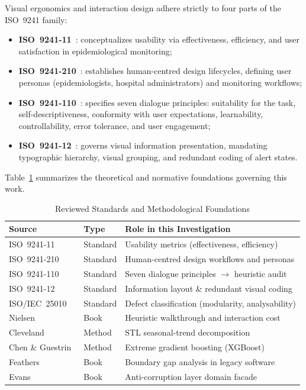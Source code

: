 \documentclass[conference]{IEEEtran}
\begin{document}
Visual ergonomics and interaction design adhere strictly to four parts of the ISO~9241 family:
\begin{itemize}
  \item \textbf{ISO~9241-11}~\cite{ISO9241-11}: conceptualizes usability via effectiveness, efficiency, and user satisfaction in epidemiological monitoring;
  \item \textbf{ISO~9241-210}~\cite{ISO9241-210}: establishes human-centred design lifecycles, defining user personas (epidemiologists, hospital administrators) and monitoring workflows;
  \item \textbf{ISO~9241-110}~\cite{ISO9241-110}: specifies seven dialogue principles: suitability for the task, self-descriptiveness, conformity with user expectations, learnability, controllability, error tolerance, and user engagement;
  \item \textbf{ISO~9241-12}~\cite{ISO9241-12}: governs visual information presentation, mandating typographic hierarchy, visual grouping, and redundant coding of alert states.
\end{itemize}

Table~\ref{tab:sources} summarizes the theoretical and normative foundations governing this work.

\begin{table}[!t]
\caption{Reviewed Standards and Methodological Foundations}
\label{tab:sources}
\centering
\footnotesize
\begin{tabularx}{\columnwidth}{@{}p{2.3cm}p{1.4cm}X@{}}
\toprule
\textbf{Source} & \textbf{Type} & \textbf{Role in this Investigation} \\
\midrule
ISO~9241-11 & Standard & Usability metrics (effectiveness, efficiency) \\
\addlinespace
ISO~9241-210 & Standard & Human-centred design workflows and personas \\
\addlinespace
ISO~9241-110 & Standard & Seven dialogue principles $\to$ heuristic audit \\
\addlinespace
ISO~9241-12 & Standard & Information layout \& redundant visual coding \\
\addlinespace
ISO/IEC~25010 & Standard & Defect classification (modularity, analysability) \\
\addlinespace
Nielsen~\cite{Nielsen1993} & Book & Heuristic walkthrough and interaction cost \\
\addlinespace
Cleveland~\cite{Cleveland1990} & Method & STL seasonal-trend decomposition \\
\addlinespace
Chen \& Guestrin~\cite{ChenGuestrin2016} & Method & Extreme gradient boosting (XGBoost) \\
\addlinespace
Feathers~\cite{Feathers2004} & Book & Boundary gap analysis in legacy software \\
\addlinespace
Evans~\cite{Evans2003} & Book & Anti-corruption layer domain facade \\
\bottomrule
\end{tabularx}
\end{table}
\end{document}
